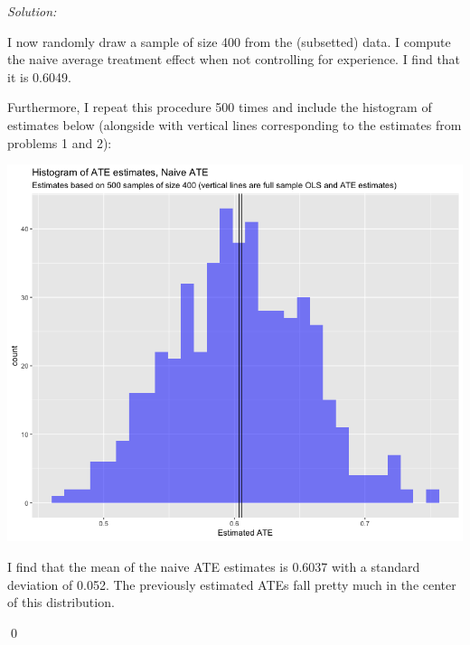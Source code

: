 \documentclass[12pt]{article}
\newenvironment{problem}[2][Problem]{\begin{trivlist}
\item[\hskip \labelsep {\bfseries #1}\hskip \labelsep {\bfseries #2.}]}{\end{trivlist}}
\newenvironment{sol}
    {\emph{Solution:}
    }
    {
    \qed
    }
\begin{document}
\begin{problem}{3}
\end{problem}
\begin{sol}
I now randomly draw a sample of size 400 from the (subsetted) data. I compute the naive average treatment effect when not controlling for experience. I find that it is 0.6049.

Furthermore, I repeat this procedure 500 times and include the histogram of estimates below (alongside with vertical lines corresponding to the estimates from problems 1 and 2):

\begin{center}
    \includegraphics[scale=0.5]{Naive_hist.png}
\end{center}

I find that the mean of the naive ATE estimates is 0.6037 with a standard deviation of 0.052. The previously estimated ATEs fall pretty much in the center of this distribution.
\end{sol}
\end{document}
